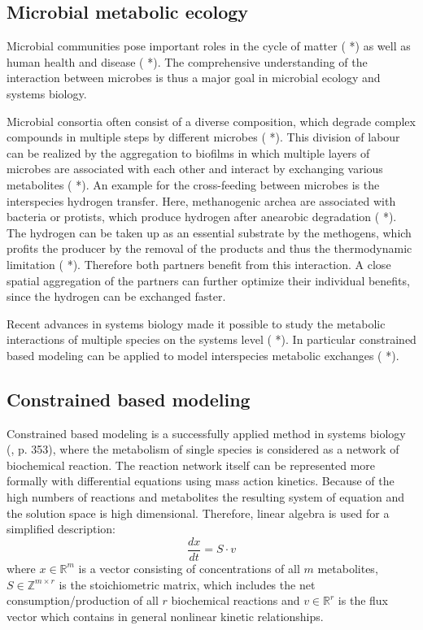 \subsection{Microbial metabolic ecology}
Microbial communities pose important roles in the cycle of matter ( *) as well as human health and disease ( *). The comprehensive understanding of the interaction between microbes is thus a major goal in microbial ecology and systems biology. 

Microbial consortia often consist of a diverse composition, which degrade complex compounds in multiple steps by different microbes ( *). This division of labour can be realized by the aggregation to biofilms in which multiple layers of microbes are associated with each other and interact by exchanging various metabolites ( *). An example for the cross-feeding between microbes is the interspecies hydrogen transfer. Here, methanogenic archea are associated with bacteria or protists, which produce hydrogen after anearobic degradation ( *). The hydrogen can be taken up as an essential substrate by the methogens, which profits the producer by the removal of the products and thus the thermodynamic limitation ( *). Therefore both partners benefit from this interaction. A close spatial aggregation of the partners can further optimize their individual benefits, since the hydrogen can be exchanged faster.

Recent advances in systems biology made it possible to study the metabolic interactions of multiple species on the systems level ( *). In particular constrained based modeling can be applied to model interspecies metabolic exchanges ( *).
 
\subsection{Constrained based modeling}
\label{cobra}
Constrained based modeling is a successfully applied method in systems biology (\cite{Esvelt2013}, \cite{Klipp2010} p. 353), where the metabolism of single species is considered as a network of biochemical reaction.
The reaction network itself can be represented more formally with differential equations using mass action kinetics.
Because of the high numbers of reactions and metabolites the resulting system of equation and the solution space is high dimensional.
Therefore, linear algebra is used for a simplified description:
\[
  \frac{dx}{dt}=S \cdot v
\]
where $x\in \mathbb{R}^m$ is a vector consisting of concentrations of all $m$ metabolites, $S\in \mathbb{Z}^{m\times r}$ is the stoichiometric matrix, which includes the net consumption/production of all $r$ biochemical reactions and $v \in \mathbb{R}^r$ is the flux vector which contains in general nonlinear kinetic relationships.

